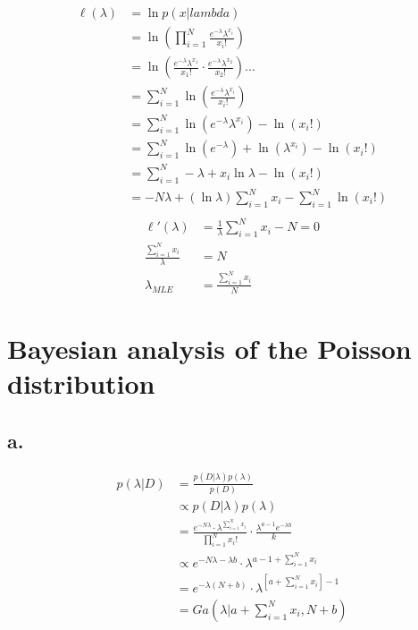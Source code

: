 \documentclass{article}
\begin{document}
\begin{align*}
  \ell(\lambda) &= \ln p(x|lambda) \\
                &= \ln \left( \prod_{i=1}^N \frac{e^{-\lambda}\lambda^{x_i}}{x_i!}
                  \right) \\
                &= \ln \left( \frac{e^{-\lambda}\lambda^{x_1}}{x_1!} \cdot
                  \frac{e^{-\lambda}\lambda^{x_2}}{x_2!} \right) ... \\
                &= \sum_{i=1}^N \ln \left(
                  \frac{e^{-\lambda}\lambda^{x_i}}{x_i!} \right) \\
                &= \sum_{i=1}^N \ln (e^{-\lambda} \lambda^{x_i}) - \ln(x_i!) \\
                &= \sum_{i=1}^N \ln (e^{-\lambda}) + \ln (\lambda^{x_i}) - \ln
                  (x_i!) \\
                &= \sum_{i=1}^N -\lambda + x_i \ln \lambda - \ln
                  \left( x_i! \right) \\
                &= -N\lambda + \left( \ln \lambda \right) \sum_{i=1}^N {x_i} -
                  \sum_{i=1}^N \ln \left( x_i! \right) \\
\end{align*}
\begin{align*}
  \ell'(\lambda) &= \frac{1}{\lambda} \sum_{i=1}^N {x_i} - N = 0 \\
  \frac{\sum_{i=1}^N {x_i}}{\lambda} &= N \\
  \lambda_{MLE} &= \frac{\sum_{i=1}^N x_i}{N}
\end{align*}

\section{Bayesian analysis of the Poisson distribution}
\subsection{a.}

\begin{align*}
  p(\lambda|D) &= \frac{p(D|\lambda)p(\lambda)}{p(D)} \\
               &\propto p(D|\lambda)p(\lambda) \\
               &= \frac{e^{-N\lambda} \cdot \lambda^{\sum_{i=1}^N
                 x_i}}{\prod_{i=1}^N x_i!} \cdot \frac{\lambda^{a-1}
                 e^{-\lambda b}}{k} \\
               &\propto e^{-N\lambda - \lambda b} \cdot
                 \lambda^{a - 1 + \sum_{i=1}^N x_i} \\
               &= e^{-\lambda (N + b)} \cdot \lambda^{ \left[ a +
                 \sum_{i=1}^N x_i \right] - 1} \\
               &= Ga(\lambda | a + \sum_{i=1}^N x_i, N + b)
\end{align*}
\end{document}
